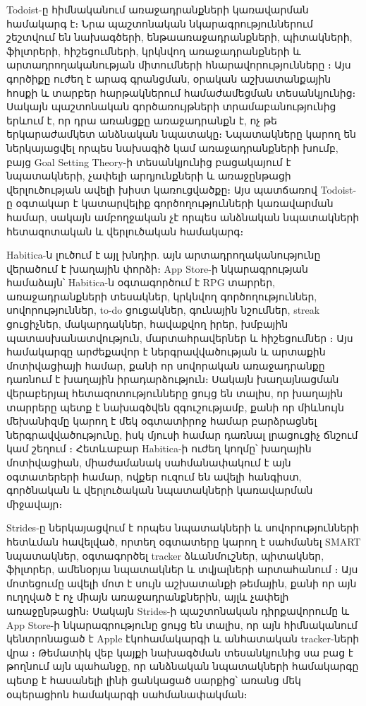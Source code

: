 Todoist-ը հիմնականում առաջադրանքների կառավարման համակարգ է։ Նրա պաշտոնական նկարագրություններում շեշտվում են նախագծերի, ենթաառաջադրանքների, պիտակների, ֆիլտրերի, հիշեցումների, կրկնվող առաջադրանքների և արտադրողականության միտումների հնարավորությունները \autocite{todoistFeatures}։ Այս գործիքը ուժեղ է արագ գրանցման, օրական աշխատանքային հոսքի և տարբեր հարթակներում համաժամեցման տեսանկյունից։ Սակայն պաշտոնական գործառույթների տրամաբանությունից երևում է, որ դրա առանցքը առաջադրանքն է, ոչ թե երկարաժամկետ անձնական նպատակը։ Նպատակները կարող են ներկայացվել որպես նախագիծ կամ առաջադրանքների խումբ, բայց Goal Setting Theory-ի տեսանկյունից բացակայում է նպատակների, չափելի արդյունքների և առաջընթացի վերլուծության ավելի խիստ կառուցվածքը։ Այս պատճառով Todoist-ը օգտակար է կատարվելիք գործողությունների կառավարման համար, սակայն ամբողջական չէ որպես անձնական նպատակների հետազոտական և վերլուծական համակարգ։

Habitica-ն լուծում է այլ խնդիր. այն արտադրողականությունը վերածում է խաղային փորձի։ App Store-ի նկարագրության համաձայն՝ Habitica-ն օգտագործում է RPG տարրեր, առաջադրանքների տեսակներ, կրկնվող գործողություններ, սովորություններ, to-do ցուցակներ, գունային նշումներ, streak ցուցիչներ, մակարդակներ, հավաքվող իրեր, խմբային պատասխանատվություն, մարտահրավերներ և հիշեցումներ \autocite{habiticaAppStore}։ Այս համակարգը արժեքավոր է ներգրավվածության և արտաքին մոտիվացիայի համար, քանի որ սովորական առաջադրանքը դառնում է խաղային իրադարձություն։ Սակայն խաղայնացման վերաբերյալ հետազոտությունները ցույց են տալիս, որ խաղային տարրերը պետք է նախագծվեն զգուշությամբ, քանի որ միևնույն մեխանիզմը կարող է մեկ օգտատիրոջ համար բարձրացնել ներգրավվածությունը, իսկ մյուսի համար դառնալ լրացուցիչ ճնշում կամ շեղում \autocite{sailer2017gamification,wang2022gamification}։ Հետևաբար Habitica-ի ուժեղ կողմը՝ խաղային մոտիվացիան, միաժամանակ սահմանափակում է այն օգտատերերի համար, ովքեր ուզում են ավելի հանգիստ, գործնական և վերլուծական նպատակների կառավարման միջավայր։

Strides-ը ներկայացվում է որպես նպատակների և սովորությունների հետևման հավելված, որտեղ օգտատերը կարող է սահմանել SMART նպատակներ, օգտագործել tracker ձևանմուշներ, պիտակներ, ֆիլտրեր, ամենօրյա նպատակներ և տվյալների արտահանում \autocite{stridesOfficial,appleStrides}։ Այս մոտեցումը ավելի մոտ է սույն աշխատանքի թեմային, քանի որ այն ուղղված է ոչ միայն առաջադրանքներին, այլև չափելի առաջընթացին։ Սակայն Strides-ի պաշտոնական դիրքավորումը և App Store-ի նկարագրությունը ցույց են տալիս, որ այն հիմնականում կենտրոնացած է Apple էկոհամակարգի և անհատական tracker-ների վրա \autocite{appleStrides}։ Թեմատիկ վեբ կայքի նախագծման տեսանկյունից սա բաց է թողնում այն պահանջը, որ անձնական նպատակների համակարգը պետք է հասանելի լինի ցանկացած սարքից՝ առանց մեկ օպերացիոն համակարգի սահմանափակման։

